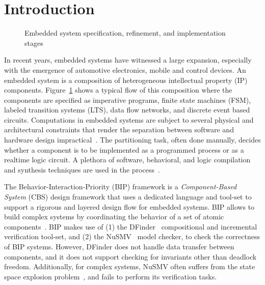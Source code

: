\section{Introduction}
\label{sect-intro}

\begin{figure}
\resizebox{.9\columnwidth}{!}{
  
}
\caption{Embedded system specification, refinement, and implementation stages}
\label{fig:flow}
\end{figure}

In recent years, embedded systems have witnessed a large 
expansion, especially with  the emergence of automotive 
electronics, mobile and control devices.
An embedded system is a composition of heterogeneous 
intellectual property (IP) components.
Figure~\ref{fig:flow} shows a typical flow of this composition where the
components are specified as imperative programs, finite state machines (FSM), labeled 
transition systems (LTS), data flow networks, and discrete event based circuits. 
Computations in embedded systems are subject to several 
physical and architectural 
constraints that render the separation between software and 
hardware design impractical~\cite{henzinger2006embedded}.
The partitioning task, often done manually, decides whether a component is to 
be implemented as a programmed process or as a realtime logic circuit. 
A plethora of software, behavioral, and logic compilation and synthesis techniques are
used in the process~\cite{metropolis1}.

The Behavior-Interaction-Priority (BIP) framework 
is a {\em Component-Based System} (CBS) design framework that uses a dedicated 
language and tool-set to support a rigorous and layered design flow for embedded 
systems.  
BIP allows to build complex systems by coordinating the behavior of a set of 
atomic components~\cite{BasuBBCJNS11}.
BIP makes use of (1) the DFinder~\cite{dfinder} compositional  
and incremental verification tool-set, and (2) the NuSMV~\cite{nusmv} model checker, 
to check the correctness of BIP systems. 
However, DFinder \cite{BBL14} does not handle data transfer between components, 
and it does not support checking for invariants other than deadlock freedom. 
Additionally, for complex systems, NuSMV often suffers from the state space explosion 
problem~\cite{sipser2006introduction}, and fails to perform its verification tasks.

